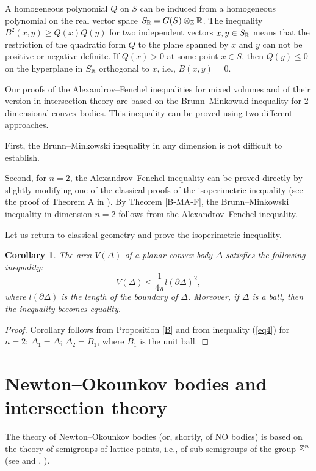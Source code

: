 \documentclass[11pt]{article}
\theoremstyle{plain}
\newtheorem{corollary}[theorem]{Corollary}
\theoremstyle{definition}
\begin{document}
A homogeneous polynomial $Q$ on $S$ can be induced from a homogeneous polynomial  on the real vector space $S_{\Bbb R}= G(S)\otimes_{\Bbb Z} \Bbb R$.  The  inequality $B^2(x,y)\geq Q(x)Q(y)$  for two independent vectors $x,y\in S_{\Bbb R}$ means that the restriction of the quadratic form $Q$ to the plane spanned by $x$ and $y$ can not be positive or negative  definite. If $Q(x)>0$ at some point $x\in S$, then $Q(y)\leq 0$ on the hyperplane in $S_{\Bbb R}$ orthogonal to $x$, i.e., $B(x,y)=0$.

Our proofs of the  Alexandrov--Fenchel inequalities for mixed volumes and of their version  in intersection theory are based on the Brunn--Minkowski inequality for 2-dimensional convex bodies.
This inequality can be proved using two different approaches.

First, the Brunn--Minkowski inequality in any dimension is not difficult to establish.

Second, for $n=2$, the Alexandrov--Fenchel inequality can be proved directly by slightly modifying one of the classical proofs of the isoperimetric inequality (see the proof of Theorem A in \cite{Kh-T14}). By Theorem \ref{B-MA-F}, the Brunn--Minkowski inequality in dimension $n=2$ follows from the Alexandrov--Fenchel inequality.

Let us return to classical geometry and prove the isoperimetric inequality.

\begin{corollary} The area $V(\Delta)$ of a planar  convex body $\Delta$ satisfies the following inequality: \begin{equation*} V(\Delta)\leq \frac{1}{4\pi} l(\partial \Delta)^2,\end{equation*}
where $l(\partial \Delta)$ is the length of the boundary of $\Delta$. Moreover, if $\Delta$ is a ball, then the inequality becomes equality.
\end{corollary}

\begin{proof} Corollary follows from  Proposition \ref{B} and from  inequality (\ref{eq4}) for $n=2$; $\Delta_1=\Delta$; $\Delta_2=B_1$, where $B_1$ is the unit ball.
  \end{proof}


\section{Newton--Okounkov bodies and intersection theory}\label{sect7}
The theory of Newton--Okounkov bodies (or, shortly,  of NO bodies) is based on the theory of semigroups of lattice points, i.e., of sub-semigroups of the group $\Bbb Z^n$ (see  \cite{K-K12} and  \cite{K-K08},  \cite{LM09}).
\end{document}

